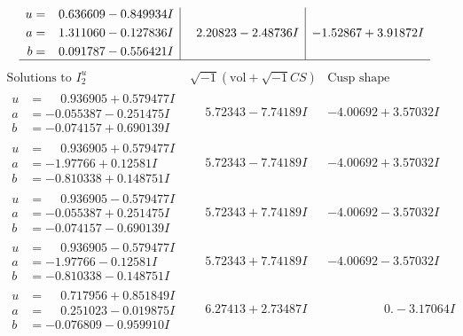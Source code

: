 \documentclass[1p]{elsarticle_modified}
\theoremstyle{definition}
\newcommand{\I}{\sqrt{-1}}
\begin{document}
$$\begin{array}{c|c|c}
\begin{aligned}
u &= \phantom{-}0.636609 - 0.849934 I \\
a &= \phantom{-}1.311060 - 0.127836 I \\
b &= \phantom{-}0.091787 - 0.556421 I\end{aligned}
 & \phantom{-}2.20823 - 2.48736 I & -1.52867 + 3.91872 I\\
 \hline 
 \end{array}$$\newpage$$\begin{array}{c|c|c}  
\text{Solutions to }I^u_{2}& \I (\text{vol} + \sqrt{-1}CS) & \text{Cusp shape}\\
 \hline 
\begin{aligned}
u &= \phantom{-}0.936905 + 0.579477 I \\
a &= -0.055387 - 0.251475 I \\
b &= -0.074157 + 0.690139 I\end{aligned}
 & \phantom{-}5.72343 - 7.74189 I & -4.00692 + 3.57032 I \\ \hline\begin{aligned}
u &= \phantom{-}0.936905 + 0.579477 I \\
a &= -1.97766 + 0.12581 I \\
b &= -0.810338 + 0.148751 I\end{aligned}
 & \phantom{-}5.72343 - 7.74189 I & -4.00692 + 3.57032 I \\ \hline\begin{aligned}
u &= \phantom{-}0.936905 - 0.579477 I \\
a &= -0.055387 + 0.251475 I \\
b &= -0.074157 - 0.690139 I\end{aligned}
 & \phantom{-}5.72343 + 7.74189 I & -4.00692 - 3.57032 I \\ \hline\begin{aligned}
u &= \phantom{-}0.936905 - 0.579477 I \\
a &= -1.97766 - 0.12581 I \\
b &= -0.810338 - 0.148751 I\end{aligned}
 & \phantom{-}5.72343 + 7.74189 I & -4.00692 - 3.57032 I \\ \hline\begin{aligned}
u &= \phantom{-}0.717956 + 0.851849 I \\
a &= \phantom{-}0.251023 - 0.019875 I \\
b &= -0.076809 - 0.959910 I\end{aligned}
 & \phantom{-}6.27413 + 2.73487 I & \phantom{-0.000000 } 0. - 3.17064 I \\ \hline\begin{aligned}

\end{aligned}
\end{array}$$
\end{document}
